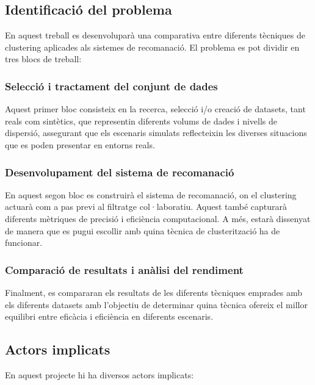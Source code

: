 \documentclass[a4paper,12pt]{report}
\begin{document}
\subsection{Identificació del problema}

En aquest treball es desenvoluparà una comparativa entre diferents tècniques de clustering aplicades als sistemes de recomanació. El problema es pot dividir en tres blocs de treball:

\subsubsection{Selecció i tractament del conjunt de dades}

Aquest primer bloc consisteix en la recerca, selecció i/o creació de datasets, tant reals com sintètics, que representin diferents volums de dades i nivells de dispersió,  
assegurant que els escenaris simulats reflecteixin les diverses situacions que es poden presentar en entorns reals.

\subsubsection{Desenvolupament del sistema de recomanació}

En aquest segon bloc es construirà el sistema de recomanació, on el clustering actuarà com a pas previ al filtratge col·laboratiu.  
Aquest també capturarà diferents mètriques de precisió i eficiència computacional.  
A més, estarà dissenyat de manera que es pugui escollir amb quina tècnica de clusterització ha de funcionar.

\subsubsection{Comparació de resultats i anàlisi del rendiment}

Finalment, es compararan els resultats de les diferents tècniques emprades amb els diferents datasets amb l'objectiu de determinar quina tècnica ofereix el millor equilibri entre eficàcia i eficiència en diferents escenaris.

\subsection{Actors implicats}

En aquest projecte hi ha diversos actors implicats:
\end{document}
